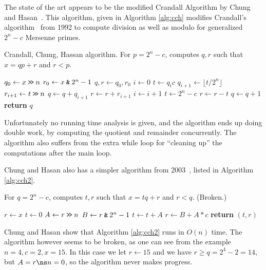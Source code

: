 The state of the art appears to be the modified Crandall Algorithm by Chung and Hasan~\cite{chung2006low}.
This algorithm, given in Algorithm \ref{alg:cch} modifies Crandall's algorithm~\cite{crandall1992method} from 1992 to compute division as well as modulo for generalized $2^n-c$ Mersenne primes.
\begin{algorithm}\label{alg:cch}
   \caption{Crandall, Chung, Hassan algorithm. For $p=2^n-c$, computes $q, r$ such that $x = qp+r$ and $r<p$.}
   \begin{algorithmic}[1]
         \State $q_0 \gets x \mathbin{\texttt{>\!>}} n $
         \State $r_0 \gets x \mathbin{\texttt{\&}} 2^n-1$
         \State $q, r \gets q_0, r_0$
         \State $i \gets 0$
            \State $t \gets q_i c$
            \State $q_{i+1} \gets \lfloor t / 2^n\rfloor$
            \State $r_{i+1} \gets t \mathbin{\texttt{>\!>}} n$
            \State $q\gets q+q_{i+1}$
            \State $r\gets r+r_{i+1}$
            \State $i\gets i+1$
         \EndWhile
         \State $t \gets 2^n-c$
            \State $r\gets r-t$
            \State $q\gets q+1$
         \EndWhile
         \State\textbf{return} $q$
      \EndProcedure
   \end{algorithmic}
\end{algorithm}
Unfortunately no running time analysis is given, and the algorithm ends up doing double work, by computing the quotient and remainder concurrently.
The algorithm also suffers from the extra while loop for ``cleaning up'' the computations after the main loop.





Chung and Hasan also has a simpler algorithm from 2003~\cite{chung2003more},
listed in Algorithm \ref{alg:cch2}.
\begin{algorithm}\label{alg:cch2}
   \caption{For $q=2^n-c$, computes $t, r$ such that $x = tq+r$ and $r<q$. (Broken.)}
   \begin{algorithmic}[1]
      \State $r \gets x$
      \State $t \gets 0$
         \State $A \gets r \mathbin{\texttt{>\!>}} n$
         \State $B \gets r \mathbin{\texttt{\&}} 2^n-1$
         \State $t \gets t + A$
         \State $r \gets B + A*c$
      \EndWhile
      \State\textbf{return} $(t, r)$
   \end{algorithmic}
\end{algorithm}
Chung and Hasan show that Algorithm \ref{alg:cch2} runs in $O(n)$ time.
The algorithm however seems to be broken, as one can see from the example
$n=4, c=2, x=15$.
In this case we let $r\gets 15$ and we have $r\ge q = 2^4-2=14$,
but $A = r \ns n = 0$, so the algorithm never makes progress.



